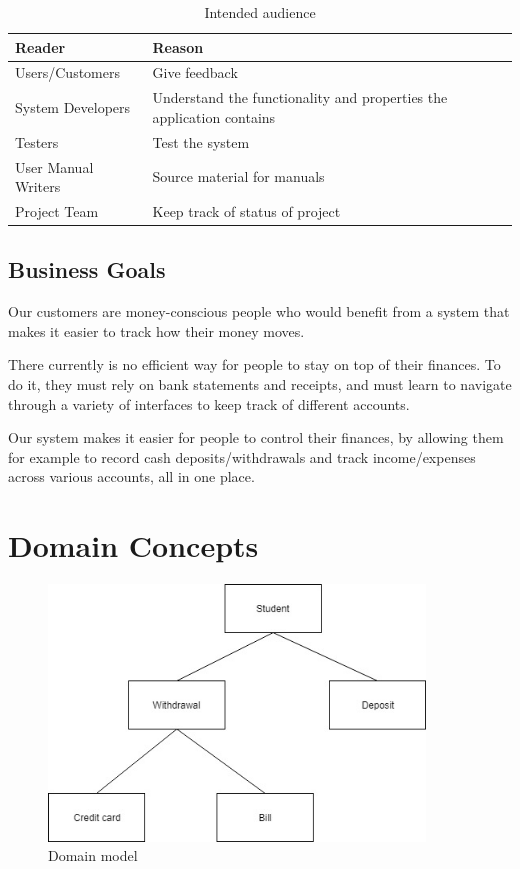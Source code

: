 \documentclass[12pt]{article}
\begin{document}
\begin{table}[htbp]
\caption{Intended audience}
\label{tab:intended_audience}
\begin{center}
  \begin{tabular}{|l|p{10cm}|}
      \hline
      Reader & Reason\\
      \hline\hline
      Users/Customers & Give feedback\\
      \hline
      System Developers & Understand the functionality and properties the application contains\\
      \hline
      Testers & Test the system\\
      \hline
      User Manual Writers & Source material for manuals\\
      \hline
      Project Team & Keep track of status of project\\
      \hline
  \end{tabular}
\end{center}
\end{table}

\subsection{Business Goals}
Our customers are money-conscious people who would benefit from a system that makes it easier to track how their money moves.

There currently is no efficient way for people to stay on top of their finances. To do it, they must rely on bank statements and receipts, and must learn to navigate through a variety of interfaces to keep track of different accounts. 

Our system makes it easier for people to control their finances, by allowing them for example to record cash deposits/withdrawals and track income/expenses across various accounts, all in one place.

\section{Domain Concepts}

\begin{figure}[h]
  \centering
  \includegraphics[width=100mm,natwidth=471,natheight=321]{model.jpg}
  \caption{Domain model}
  \label{fig:model}
\end{figure}
 
\end{document}
